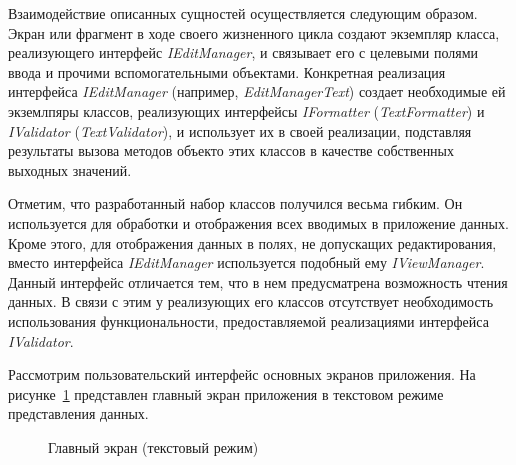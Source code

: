 Взаимодействие описанных сущностей осуществляется следующим образом.
Экран или фрагмент в ходе своего жизненного цикла создают экземпляр класса,
реализующего интерфейс \textit{IEditManager}, и связывает его с целевыми
полями ввода и прочими вспомогательными объектами.
Конкретная реализация интерфейса \textit{IEditManager}
(например, \textit{EditManagerText})
создает необходимые ей экземлпяры классов, реализующих интерфейсы
\textit{IFormatter} (\textit{TextFormatter})
и \textit{IValidator} (\textit{TextValidator}),
и использует их в своей реализации,
подставляя результаты вызова методов объекто этих классов
в качестве собственных выходных значений.

Отметим, что разработанный набор классов получился весьма гибким.
Он используется для обработки и отображения всех вводимых в приложение данных.
Кроме этого, для отображения данных в полях, не допускащих редактирования,
вместо интерфейса \textit{IEditManager} используется подобный ему \textit{IViewManager}.
Данный интерфейс отличается тем, что в нем предусматрена возможность чтения данных.
В связи с этим у реализующих его классов отсутствует необходимость
использования функциональности, предоставляемой реализациями интерфейса \textit{IValidator}.

Рассмотрим пользовательский интерфейс основных экранов приложения.
На рисунке~\ref{fig:implementation_ui_activity_balance_text}
представлен главный экран приложения в
текстовом режиме представления данных.

\begin{figure}[h!]
  \centering
  \caption{Главный экран (текстовый режим)}
  \label{fig:implementation_ui_activity_balance_text}
\end{figure}

